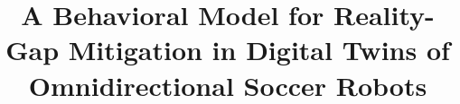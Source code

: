 \documentclass[conference,a4paper]{IEEEtran}
\begin{document}
\title{A Behavioral Model for Reality-Gap Mitigation in Digital Twins of Omnidirectional Soccer Robots
}
\end{document}

